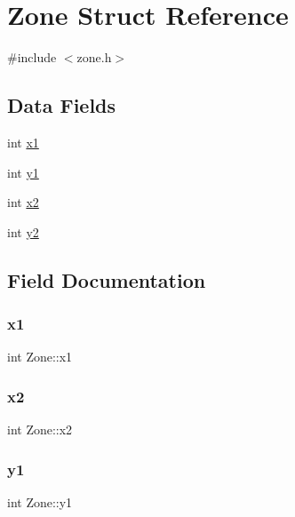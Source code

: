 \hypertarget{structZone}{}\section{Zone Struct Reference}
\label{structZone}


{\ttfamily \#include $<$zone.\+h$>$}

\subsection*{Data Fields}
\begin{DoxyCompactItemize}
\item 
int \hyperlink{structZone_af3a495f8656e34f4d2ed8429ada7aed9}{x1}
\item 
int \hyperlink{structZone_ab160ed8f9ec2dc6efef018e743f94683}{y1}
\item 
int \hyperlink{structZone_a6643320a49b430fa1cc69aac133f6da6}{x2}
\item 
int \hyperlink{structZone_a7cf6801d4594d045c56368c35fe8c7e2}{y2}
\end{DoxyCompactItemize}


\subsection{Field Documentation}
\mbox{\label{structZone_af3a495f8656e34f4d2ed8429ada7aed9}} 
\subsubsection{\texorpdfstring{x1}{x1}}
{\footnotesize\ttfamily int Zone\+::x1}

\mbox{\label{structZone_a6643320a49b430fa1cc69aac133f6da6}} 
\subsubsection{\texorpdfstring{x2}{x2}}
{\footnotesize\ttfamily int Zone\+::x2}

\mbox{\label{structZone_ab160ed8f9ec2dc6efef018e743f94683}} 
\subsubsection{\texorpdfstring{y1}{y1}}
{\footnotesize\ttfamily int Zone\+::y1}

